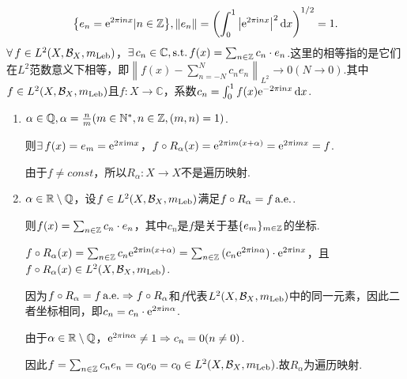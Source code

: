 \begin{instance}
    \begin{equation*}
        \qty{e_n=\mathrm{e}^{2\pi \mathrm{i}nx}|n\in\mathbb{Z}},\| e_n \|=\left(\int_0^1{\left|\mathrm{e}^{2\pi \mathrm{i} nx}\right|^2\mathop{}\!\mathrm{d} x}\right)^{1/2}=1.\end{equation*}
    $\forall\,f\in L^2(X,\mathcal{B}_X,m_\mathrm{Leb})$，$\exists\, c_n\in\mathbb{C},\operatorname{\text{s.t.}} f(x)=\sum_{n\in\mathbb{Z}}{c_n\cdot e_n}$.这里的相等指的是它们在$L^2$范数意义下相等，即$\left\|f(x)-\sum_{n=-N}^N{c_n e_n}\right\|_{L^2}\to 0(N\to 0)$.其中$f\in L^2(X,\mathcal{B}_X,m_\mathrm{Leb})$且$f:X\to\mathbb{C}$，系数$c_n=\int_0^1{f(x)\mathrm{e}^{-2\pi \mathrm{i} nx}}\mathop{}\!\mathrm{d} x$.\par
    \begin{enumerate}[(1)]
        \item $\alpha\in\mathbb{Q},\alpha=\frac{n}{m}(m\in\mathbb{N}^*,n\in\mathbb{Z},(m,n)=1)$.\par
        则$\exists\, f(x)=e_m=\mathrm{e}^{2\pi \mathrm{i} mx}$，$f\circ R_\alpha(x)=\mathrm{e}^{2\pi \mathrm{i} m(x+\alpha)}=\mathrm{e}^{2\pi \mathrm{i} mx}=f$.\par
        由于$f\neq const$，所以$R_\alpha:X\to X$不是遍历映射.
        \item $\alpha\in\mathbb{R}\setminus\mathbb{Q}$，设$f\in L^2(X,\mathcal{B}_X,m_\mathrm{Leb})$满足$f\circ R_\alpha=f\operatorname{\text{a.e.}}$.\par
        则$f(x)=\sum_{n\in\mathbb{Z}}{c_n\cdot e_n}$，其中$c_n$是$f$是关于基$\{e_m\}_{m\in\mathbb{Z}}$的坐标.\par
        $f\circ R_\alpha(x)=\sum_{n\in\mathbb{Z}}{c_n \mathrm{e}^{2\pi \mathrm{i} n(x+\alpha)}}=\sum_{n\in\mathbb{Z}}{(c_n \mathrm{e}^{2\pi \mathrm{i} n\alpha})\cdot \mathrm{e}^{2\pi \mathrm{i} nx}}$，且$f\circ R_\alpha(x)\in L^2(X,\mathcal{B}_X,m_\mathrm{Leb})$.\par
        因为$f\circ R_\alpha=f\operatorname{\text{a.e.}} \Rightarrow f\circ R_\alpha$和$f$代表$L^2(X,\mathcal{B}_X,m_\mathrm{Leb})$中的同一元素，因此二者坐标相同，即$c_n=c_n\cdot \mathrm{e}^{2\pi \mathrm{i} n\alpha}$.\par
        由于$\alpha\in\mathbb{R}\setminus\mathbb{Q}$，$\mathrm{e}^{2\pi \mathrm{i} n\alpha}\neq 1 \Rightarrow c_n=0(n\neq 0)$.\par
        因此$f=\sum_{n\in\mathbb{Z}}{c_ne_n}=c_0e_0=c_0\in L^2(X,\mathcal{B}_X,m_\mathrm{Leb})$.故$R_\alpha$为遍历映射.
    \end{enumerate}
\end{instance}

